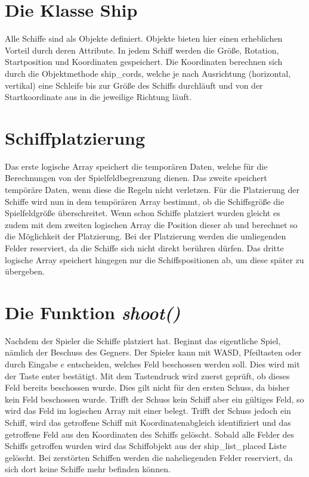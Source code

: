 \documentclass{llncs}
\begin{document}
\section{Die Klasse Ship}

Alle Schiffe sind als Objekte definiert. Objekte bieten hier einen erheblichen Vorteil durch deren Attribute.
In jedem Schiff werden die Größe, Rotation, Startposition und Koordinaten gespeichert. Die Koordinaten berechnen sich durch die Objektmethode \glqq ship\_cords\grqq{}, welche 
je nach Ausrichtung (horizontal, vertikal) eine Schleife bis zur Größe des Schiffs durchläuft und von der Startkoordinate aus in die jeweilige Richtung läuft.

\section{Schiffplatzierung}

Das erste logische Array speichert die temporären Daten, welche für die Berechnungen von der Spielfeldbegrenzung dienen. Das zweite speichert tempöräre Daten, wenn diese die Regeln nicht verletzen.
Für die Platzierung der Schiffe wird nun in dem tempörären Array bestimmt, ob die Schiffsgröße die Spielfeldgröße überschreitet. Wenn schon Schiffe platziert wurden gleicht es zudem mit dem zweiten logischen
Array die Position dieser ab und berechnet so die Möglichkeit der Platzierung. Bei der Platzierung werden die umliegenden Felder reserviert, da die Schiffe sich nicht direkt berühren dürfen. Das dritte logische 
Array speichert hingegen nur die Schiffspositionen ab, um diese später zu übergeben.

\section{Die Funktion \emph{shoot()}}

Nachdem der Spieler die Schiffe platziert hat. Beginnt das eigentliche Spiel, nämlich der Beschuss des Gegners. Der Spieler kann mit WASD, Pfeiltasten oder durch Eingabe \(e\) entscheiden,
welches Feld beschossen werden soll. Dies wird mit der Taste \glqq enter\grqq{} bestätigt. Mit dem Tastendruck wird zuerst geprüft, ob dieses Feld bereits beschossen wurde.
Dies gilt nicht für den ersten Schuss, da bisher kein Feld beschossen wurde. Trifft der Schuss kein Schiff aber ein gültiges Feld, so wird das Feld im logischen Array mit einer \grqq{} belegt.
Trifft der Schuss jedoch ein Schiff, wird das getroffene Schiff mit Koordinatenabgleich identifiziert und das getroffene Feld aus den Koordinaten des Schiffs gelöscht.
Sobald alle Felder des Schiffs getroffen wurden wird das Schiffobjekt aus der ship\_list\_placed Liste gelöscht. Bei zerstörten Schiffen werden die naheliegenden Felder reserviert,
da sich dort keine Schiffe mehr befinden können.
\end{document}
